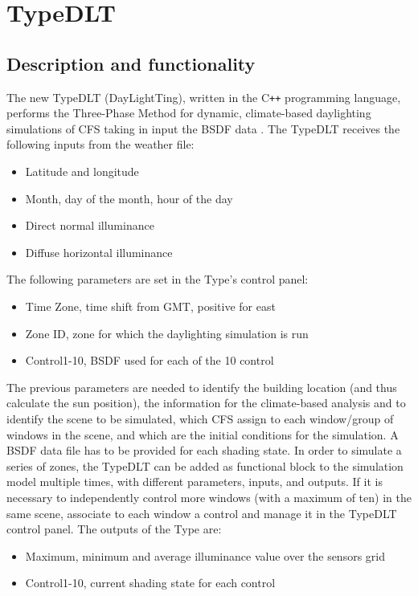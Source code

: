 \chapter{TypeDLT}
\section{Description and functionality}
The new TypeDLT (DayLightTing), written in the C\texttt{++} programming language, performs the Three-Phase Method for dynamic, climate-based daylighting simulations of CFS taking in input the BSDF data \cite{bsa}.
The TypeDLT receives the following inputs from the weather file:
\begin{itemize}
\renewcommand{\labelitemi}{\tiny$\blacksquare$}
\item Latitude and longitude
\item Month, day of the month, hour of the day
\item Direct normal illuminance
\item Diffuse horizontal illuminance
\end{itemize}
The following parameters are set in the Type's control panel:
\begin{itemize}
\renewcommand{\labelitemi}{\tiny$\blacksquare$}
\item Time Zone, time shift from GMT, positive for east
\item Zone ID, zone for which the daylighting simulation is run
\item Control1-10, BSDF used for each of the 10 control
\end{itemize}
The previous parameters are needed to identify the building location (and thus calculate the sun position), the information for the climate-based analysis and to identify the scene to be simulated, which CFS assign to each window/group of windows in the scene, and which are the initial conditions for the simulation. A BSDF data file has to be provided for each shading state. In order to simulate a series of zones, the TypeDLT can be added as functional block to the simulation model multiple times, with different parameters, inputs, and outputs. If it is necessary to independently control more windows (with a maximum of ten) in the same scene, associate to each window a control and manage it in the TypeDLT control panel.
The outputs of the Type are:
\begin{itemize}
\renewcommand{\labelitemi}{\tiny$\blacksquare$}
\item Maximum, minimum and average illuminance value over the sensors grid
\item Control1-10, current shading state for each control
\end{itemize}
